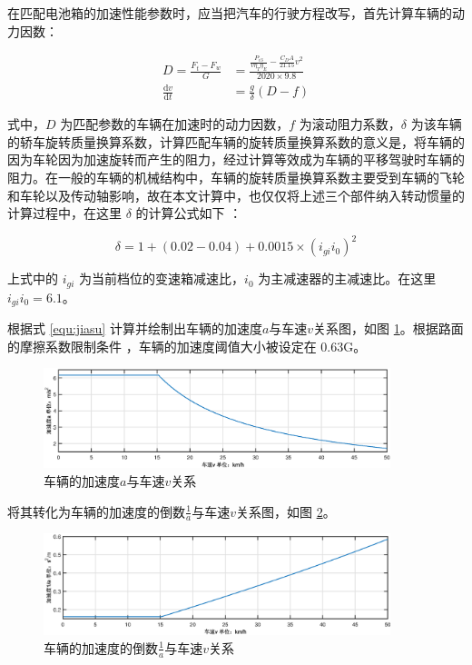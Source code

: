 在匹配电池箱的加速性能参数时，应当把汽车的行驶方程改写，首先计算车辆的动力因数：

\begin{equation}
\begin{aligned}
	\label{equ:jiasu}
	D=\frac{F_t-F_w}{G}&=\frac{\frac{P_{e3}}{v\eta_T\eta_E}-\frac{C_DA}{21.15}v^2}{2020\times 9.8}\\
	\frac{\mathrm{d}v}{\mathrm{d}t}&=\frac{g}{\delta}(D-f)
\end{aligned}
\end{equation}

式中，$D$ 为匹配参数的车辆在加速时的动力因数，$f$ 为滚动阻力系数，$\delta$ 为该车辆的轿车旋转质量换算系数，计算匹配车辆的旋转质量换算系数的意义是，将车辆的因为车轮因为加速旋转而产生的阻力，经过计算等效成为车辆的平移驾驶时车辆的阻力。在一般的车辆的机械结构中，车辆的旋转质量换算系数主要受到车辆的飞轮和车轮以及传动轴影响，故在本文计算中，也仅仅将上述三个部件纳入转动惯量的计算过程中，在这里 $\delta$ 的计算公式如下 \cite{段建民2011串联式混合动力电动汽车复合电源系统设计}：

\begin{equation}
	\label{equ:rot}
	\delta=1+(0.02-0.04)+0.0015\times(i_{gi}i_0)^2
\end{equation}

上式中的 $i_{gi}$ 为当前档位的变速箱减速比，$i_0$ 为主减速器的主减速比。在这里 $i_{gi}i_0=6.1$。

根据式 \ref{equ:jiasu} 计算并绘制出车辆的加速度$a$与车速$v$关系图，如图 \ref{fig:a-v}。根据路面的摩擦系数限制条件 \cite{胡朋2011不同状态下路面摩擦系数现场试验}，车辆的加速度阈值大小被设定在 0.63G。

\begin{figure}
	\centering
	\includegraphics[width=0.9\textwidth]{figures/a-v.eps}
	\caption{车辆的加速度$a$与车速$v$关系}\label{fig:a-v}
\end{figure}

将其转化为车辆的加速度的倒数$\frac{1}{a}$与车速$v$关系图，如图 \ref{fig:aa-v}。

\begin{figure}
	\centering
	\includegraphics[width=0.9\textwidth]{figures/aa-v.eps}
	\caption{车辆的加速度的倒数$\frac{1}{a}$与车速$v$关系}\label{fig:aa-v}
\end{figure}

